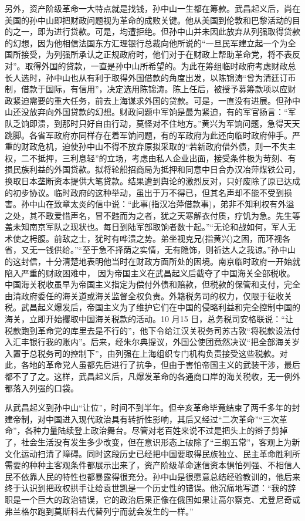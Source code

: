 另外，资产阶级革命一大特点就是找钱，孙中山一生都在筹款。武昌起义后，尚在美国的孙中山即把财政问题视为革命的成败关键。他从美国到伦敦和巴黎活动的目的之一，即为进行贷款。可是，均遭拒绝。但孙中山并未因此放弃从列强取得贷款的幻想，因为他相信法国东方汇理银行总裁向他所说的“一旦民军建立起一个为全国所接受，为列强所承认之正规政府时，他们对于在财政上帮助革命党，将不表反对”。取得外国的贷款，一直是孙中山所希望的。为此在筹组临时政府考虑财政总长人选时，孙中山也从有利于取得外国借款的角度出发，以陈锦涛“曾为清廷订币制，借款于国际，有信用”，决定选用陈锦涛。陈上任后，被授予募筹款项以应财政紧迫需要的重大任务，前去上海谋求外国的贷款。可是，一直没有进展。但孙中山还没放弃向外国贷款的幻想。财政问题中军饷是最为紧迫，有的军官扬言：“军队乏饷即溃，到那时只好自由行动，莫怪对不住地方。”黄兴为军饷问题，急得天天跳脚。各省军政府亦同样存在着军饷问题，有的军政府为此还向临时政府伸手。严重的财政危机，迫使孙中山不得不放弃原拟采取的“若新政府借外债，则一不失主权，二不抵押，三利息轻”的立场，考虑由私人企业出面，接受条件极为苛刻、有损民族利益的外国贷款。拟将轮船招商局为抵押和同意中日合办汉冶萍煤铁公司，换取日本垄断资本提供大笔贷款。结果遭到舆论的激烈反对，只好废除了原已达成的初步协议。临时政府的这种举动，虽出于万不得已，但其名声却不能不受到损害。孙中山在致章太炎的信中说：“此事(指汉冶萍借款事)，弟非不知利权有外溢之处，其不敢爱惜声名，冒不韪而为之者，犹之天寒解衣付质，疗饥为急。先生等盖未知南京军队之现状也。每日到陆军部取饷者数十起。”“无论和战如何，军人无术使之枵腹。前敌之士，犹时有哗溃之势。弟坐视克兄(指黄兴)之困，而环视各省，又无一钱供给。”“至于急不择荫之实情，无有隐饰，则祈达人之我谅。”孙中山的这封信，十分清楚地表明他当时在财政方面所处的困境。南京临时政府一开始就陷入严重的财政困难中， 因为帝国主义在武昌起义后截夺了中国海关全部税收。中国海关税收虽早为帝国主义指定为偿付外债和赔款，但税款的保管和支付，完全由清政府委任的海关道或海关监督全权负责。外籍税务司的权力，仅限于征收关税。武昌起义爆发后，帝国主义为了维护它们在中国的侵略利益和完全控制中国的海关，立即开始攫取中国海关税款的活动。10 月15 日，总务税司安格联说：“让税款跑到革命党的库里去是不行的”，他下令给江汉关税务司苏古敦“将税款设法付入汇丰银行我的账内”。后来，经朱尔典提议，外国公使团竟然决议“把全部海关岁入置于总税务司的控制下”，由列强在上海组织专门机构负责接受这些税款。对此，各地的革命党人虽都先后进行了抗争，但由于害怕帝国主义的武装干涉，最后都不了了之。这样，武昌起义后，凡爆发革命的各通商口岸的海关税收，无一例外都落入列强的口袋。

从武昌起义到孙中山“让位”，时间不到半年。但辛亥革命毕竟结束了两千多年的封建帝制，对中国进入现代政治具有转折性影响，其后又经过“二次革命”“三次革命”，各种力量陆续登上政治舞台。尽管对老百姓来说不过是把头上的辫子剪掉了，社会生活没有发生多少改变，但在意识形态上破除了“三纲五常”，客观上为新文化运动扫清了障碍。同时这段历史已经把中国要取得民族独立、民主革命胜利所需要的种种主客观条件都展示出来了，资产阶级革命迷信资本惧怕列强、不相信人民不依靠人民的特性也都暴露得很充分。孙中山是很愿意总结经验教训的，他后来终于认识到把政权拱手让给袁世凯是一个历史性的错误。他沉痛地写道：“我的辞职是一个巨大的政治错误，它的政治后果正像在俄国如果让高尔察克、尤登尼奇或弗兰格尔跑到莫斯科去代替列宁而就会发生的一样。”

